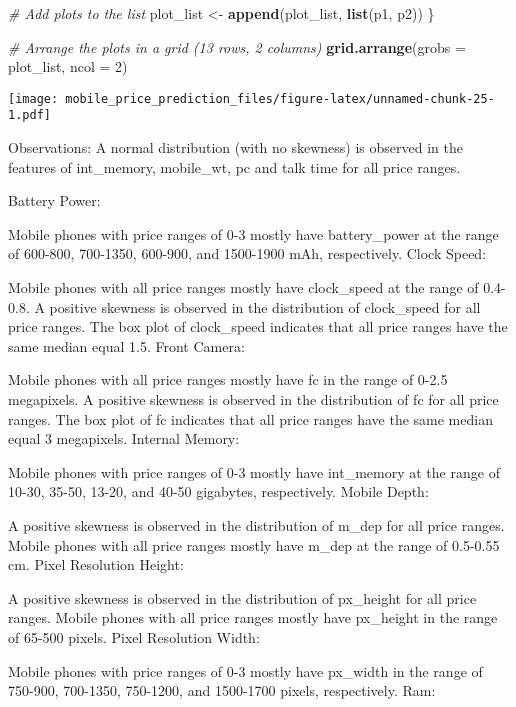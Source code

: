 \documentclass[
]{article}
\newenvironment{Shaded}{\begin{snugshade}}{\end{snugshade}}
\newcommand{\AttributeTok}[1]{\textcolor[rgb]{0.13,0.29,0.53}{#1}}
\newcommand{\CommentTok}[1]{\textcolor[rgb]{0.56,0.35,0.01}{\textit{#1}}}
\newcommand{\DecValTok}[1]{\textcolor[rgb]{0.00,0.00,0.81}{#1}}
\newcommand{\FunctionTok}[1]{\textcolor[rgb]{0.13,0.29,0.53}{\textbf{#1}}}
\newcommand{\NormalTok}[1]{#1}
\newcommand{\OtherTok}[1]{\textcolor[rgb]{0.56,0.35,0.01}{#1}}
\begin{document}
\begin{Shaded}
\begin{Highlighting}[]
  \CommentTok{\# Add plots to the list}
\NormalTok{  plot\_list }\OtherTok{\textless{}{-}} \FunctionTok{append}\NormalTok{(plot\_list, }\FunctionTok{list}\NormalTok{(p1, p2))}
\NormalTok{\}}

\CommentTok{\# Arrange the plots in a grid (13 rows, 2 columns)}
\FunctionTok{grid.arrange}\NormalTok{(}\AttributeTok{grobs =}\NormalTok{ plot\_list, }\AttributeTok{ncol =} \DecValTok{2}\NormalTok{)}
\end{Highlighting}
\end{Shaded}

\texttt{[image: mobile\_price\_prediction\_files/figure-latex/unnamed-chunk-25-1.pdf]}

Observations: A normal distribution (with no skewness) is observed in
the features of int\_memory, mobile\_wt, pc and talk time for all price
ranges.

Battery Power:

Mobile phones with price ranges of 0-3 mostly have battery\_power at the
range of 600-800, 700-1350, 600-900, and 1500-1900 mAh, respectively.
Clock Speed:

Mobile phones with all price ranges mostly have clock\_speed at the
range of 0.4-0.8. A positive skewness is observed in the distribution of
clock\_speed for all price ranges. The box plot of clock\_speed
indicates that all price ranges have the same median equal 1.5. Front
Camera:

Mobile phones with all price ranges mostly have fc in the range of 0-2.5
megapixels. A positive skewness is observed in the distribution of fc
for all price ranges. The box plot of fc indicates that all price ranges
have the same median equal 3 megapixels. Internal Memory:

Mobile phones with price ranges of 0-3 mostly have int\_memory at the
range of 10-30, 35-50, 13-20, and 40-50 gigabytes, respectively. Mobile
Depth:

A positive skewness is observed in the distribution of m\_dep for all
price ranges. Mobile phones with all price ranges mostly have m\_dep at
the range of 0.5-0.55 cm. Pixel Resolution Height:

A positive skewness is observed in the distribution of px\_height for
all price ranges. Mobile phones with all price ranges mostly have
px\_height in the range of 65-500 pixels. Pixel Resolution Width:

Mobile phones with price ranges of 0-3 mostly have px\_width in the
range of 750-900, 700-1350, 750-1200, and 1500-1700 pixels,
respectively. Ram:
\end{document}
